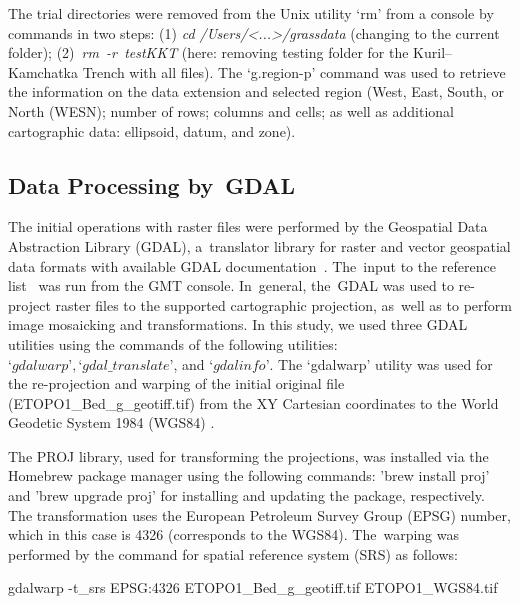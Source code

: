 \documentclass[technologies,article,accept,pdftex,moreauthors]{Definitions/mdpi}
\begin{document}
The trial directories were removed from the Unix utility ‘rm’ from a console by commands in two steps: (1) \emph{cd /Users/{<...>}/grassdata} (changing to the current folder); \mbox{(2) \emph{rm -r testKKT}} (here: removing testing folder for the Kuril--Kamchatka Trench with all files).
The ‘g.region-p’ command was used to retrieve the information on the data extension and selected region (West, East, South, or North (WESN); number of rows; columns and cells; as well as additional cartographic data: ellipsoid, datum, and zone). 

\subsection{Data Processing by~GDAL}

The initial operations with raster files were performed by the Geospatial Data Abstraction Library (GDAL), a~translator library for raster and vector geospatial data formats {with available }GDAL documentation~\cite{GDAL}. The~input to the reference list~\cite{GDAL} was run from the GMT console. In~general, the~GDAL was used to re-project raster files to the supported cartographic projection, as~well as to perform image mosaicking and transformations{. }In this study, we used three GDAL utilities using the commands of the following utilities:\\ 
$‘gdalwarp’, ‘gdal\_translate’$, and $‘gdalinfo’${. }The ‘gdalwarp’ utility was used for the re-projection and warping of the initial original file (ETOPO1\_Bed\_g\_geotiff.tif) from the XY Cartesian coordinates to the World Geodetic System 1984 (WGS84) \cite{Defense}. 

{The PROJ library, used for transforming the projections, was installed via the Homebrew package manager using the following commands: 'brew install proj' and 'brew upgrade proj' for installing and updating the package, respectively. }The transformation uses the European Petroleum Survey Group (EPSG) number, which in this case is 4326 (corresponds to the WGS84). The~warping was performed by the command for spatial reference system (SRS) as follows: 

\begin{spverbatim}
gdalwarp -t_srs EPSG:4326 ETOPO1_Bed_g_geotiff.tif ETOPO1_WGS84.tif
\end{spverbatim} 

\end{document}
